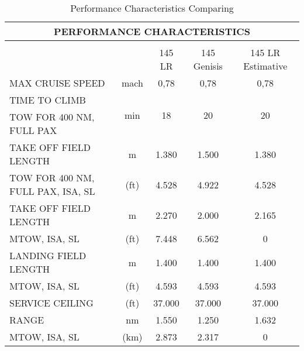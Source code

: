 \begin{table}[htbp]
  \centering
  \caption{Performance Characteristics Comparing}
    \begin{tabular}{rcccc}
    \toprule
    \multicolumn{5}{c}{\multirow{2}[1]{*}{PERFORMANCE CHARACTERISTICS}} \\
    \midrule
    \multicolumn{5}{c}{} \\
    \multicolumn{2}{c}{} & 145 LR & 145 Genisis & 145 LR Estimative \\
    \multicolumn{1}{l}{\multirow{2}[2]{*}{MAX CRUISE SPEED}} & \multirow{2}[2]{*}{mach} & \multirow{2}[2]{*}{0,78} & \multirow{2}[2]{*}{0,78} & \multirow{2}[2]{*}{0,78} \\
    \multicolumn{1}{l}{} &       &       &       &  \\
    \multicolumn{1}{l}{TIME TO CLIMB} & \multirow{2}[2]{*}{min} & \multirow{2}[2]{*}{18} & \multirow{2}[2]{*}{20} & \multirow{2}[2]{*}{20} \\
    \multicolumn{1}{l}{TOW FOR 400 NM, FULL PAX} &       &       &       &  \\
    \multicolumn{1}{l}{TAKE OFF FIELD LENGTH} & m     & 1.380 & 1.500 & 1.380 \\
    \multicolumn{1}{l}{TOW FOR 400 NM, FULL PAX, ISA, SL} & (ft)  & 4.528 & 4.922 & 4.528 \\
    \multicolumn{1}{l}{TAKE OFF FIELD LENGTH} & m     & 2.270 & 2.000 & 2.165 \\
    \multicolumn{1}{l}{MTOW, ISA, SL} & (ft)  & 7.448 & 6.562 & 0 \\
    \multicolumn{1}{l}{LANDING FIELD LENGTH} & m     & 1.400 & 1.400 & 1.400 \\
    \multicolumn{1}{l}{MTOW, ISA, SL} & (ft)  & 4.593 & 4.593 & 4.593 \\
    \multicolumn{1}{l}{\multirow{2}[2]{*}{SERVICE CEILING}} & \multirow{2}[2]{*}{(ft)} & \multirow{2}[2]{*}{37.000} & \multirow{2}[2]{*}{37.000} & \multirow{2}[2]{*}{37.000} \\
    \multicolumn{1}{l}{} &       &       &       &  \\
    \multicolumn{1}{l}{RANGE} & nm    & 1.550 & 1.250 & 1.632 \\
    \multicolumn{1}{l}{MTOW, ISA, SL} & (km)  & 2.873 & 2.317 & 0 \\
    \bottomrule
    \end{tabular}%
  \label{tab:performancecomparing}%
\end{table}%


